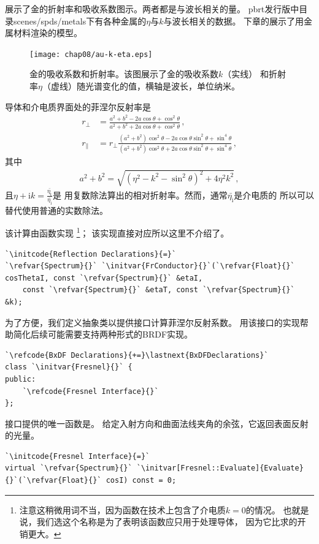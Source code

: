 展示了金的折射率和吸收系数图示。两者都是与波长相关的量。
pbrt发行版中目录{\ttfamily scenes/spds/metals}下有各种金属的$\eta$与$k$与波长相关的数据。
下章的展示了用金属材料渲染的模型。
\begin{figure}[htbp]
    \centering
    \texttt{[image: chap08/au-k-eta.eps]}
    \caption{金的吸收系数和折射率。该图展示了金的吸收系数$k$（实线）
        和折射率$\eta$（虚线）随光谱变化的值，横轴是波长，单位纳米。}
    \label{fig:8.6}
\end{figure}

导体和介电质界面处的菲涅尔反射率是
\begin{align}
    \label{eq:8.3}
    r_{\perp}     & =\frac{a^2+b^2-2a\cos\theta+\cos^2\theta}{a^2+b^2+2a\cos\theta+\cos^2\theta}\, ,\nonumber                                                     \\
    r_{\parallel} & =r_{\perp}\frac{(a^2+b^2)\cos^2\theta-2a\cos\theta\sin^2\theta+\sin^4\theta}{(a^2+b^2)\cos^2\theta+2a\cos\theta\sin^2\theta+\sin^4\theta}\, ,
\end{align}
其中
\begin{align*}
    a^2+b^2=\sqrt{(\eta^2-k^2-\sin^2\theta)^2+4\eta^2k^2}\, ,
\end{align*}
且$\displaystyle\eta+\mathrm{i}k=\frac{\bar{\eta_\mathrm{t}}}{\bar{\eta_\mathrm{i}}}$是
用复数除法算出的相对折射率。然而，通常$\bar{\eta_\mathrm{i}}$是介电质的
所以可以替代使用普通的实数除法。

该计算由函数实现
\footnote{注意这稍微用词不当，因为函数在技术上包含了介电质$k=0$的情况。
    也就是说，我们选这个名称是为了表明该函数应只用于处理导体，
    因为它比求的开销更大。}；
该实现直接对应所以这里不介绍了。
\begin{lstlisting}
`\initcode{Reflection Declarations}{=}`
`\refvar{Spectrum}{}` `\initvar{FrConductor}{}`(`\refvar{Float}{}` cosThetaI, const `\refvar{Spectrum}{}` &etaI,
    const `\refvar{Spectrum}{}` &etaT, const `\refvar{Spectrum}{}` &k);
\end{lstlisting}

为了方便，我们定义抽象类以提供接口计算菲涅尔反射系数。
用该接口的实现帮助简化后续可能需要支持两种形式的BRDF实现。
\begin{lstlisting}
`\refcode{BxDF Declarations}{+=}\lastnext{BxDFDeclarations}`
class `\initvar{Fresnel}{}` {
public:
    `\refcode{Fresnel Interface}{}`
};
\end{lstlisting}

接口提供的唯一函数是。
给定入射方向和曲面法线夹角的余弦，它返回表面反射的光量。
\begin{lstlisting}
`\initcode{Fresnel Interface}{=}`
virtual `\refvar{Spectrum}{}` `\initvar[Fresnel::Evaluate]{Evaluate}{}`(`\refvar{Float}{}` cosI) const = 0;
\end{lstlisting}


